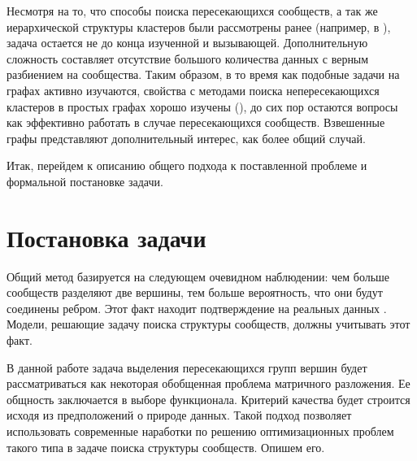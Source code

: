 \documentclass{ITaSconf}
\begin{document}
Несмотря на то, что способы поиска пересекающихся сообществ, а так же иерархической структуры кластеров были рассмотрены ранее (например, в \cite{airoldi2008mixed}), задача остается не до конца изученной и вызывающей. Дополнительную сложность составляет отсутствие большого количества данных с верным разбиением на сообщества. 
Таким образом, в то время как подобные задачи на графах активно изучаются, свойства с методами поиска непересекающихся кластеров в простых графах хорошо изучены (\cite{Fortunato10}), до сих пор остаются вопросы как эффективно работать в случае пересекающихся сообществ. Взвешенные графы представляют дополнительный интерес, как более общий случай. 

Итак, перейдем к описанию общего подхода к поставленной проблеме и формальной постановке задачи.

\section{Постановка задачи}

Общий метод базируется на следующем очевидном наблюдении: чем больше сообществ разделяют две вершины, тем больше вероятность, что они будут соединены ребром. Этот факт находит подтверждение на реальных данных \cite{yang2013overlapping}. Модели, решающие задачу поиска структуры сообществ, должны учитывать этот факт.

В данной работе задача выделения пересекающихся групп вершин будет рассматриваться как некоторая обобщенная проблема матричного разложения. Ее общность заключается в выборе функционала. Критерий качества будет строится исходя из предположений о природе данных. Такой подход позволяет использовать современные наработки по решению оптимизационных проблем такого типа в задаче поиска структуры сообществ. Опишем его.
\end{document}
